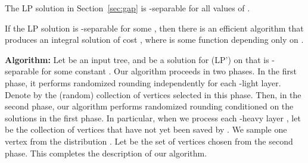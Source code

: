 \begin{observation} 
The LP solution in Section~\ref{sec:gap} is -separable for all values of .  
\end{observation}   

\begin{theorem}
If the LP solution  is -separable for some , then there is an efficient algorithm that produces an integral solution of cost , where  is some function depending only on .
\label{thm:wellseparable}
\end{theorem}  

\vspace{0.1in} 

\textbf{Algorithm:}
Let  be an input tree, and  be a solution for (LP') on  that is -separable for some constant .
Our algorithm proceeds in two phases.  
In the first phase, it performs
randomized rounding independently for each -light layer.
Denote by  the (random) collection of vertices selected in this phase. 
Then,
in the second phase, our algorithm performs randomized rounding conditioned on the solutions in
the first phase. 
In particular, when we process each -heavy layer , let  be the collection of vertices that have not yet been saved by .
We sample one vertex  from the distribution . 
Let  be the set of vertices chosen from the second phase. 
This completes the description of our algorithm. 
